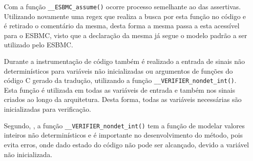 \par
Com a função \texttt{\_\_ESBMC\_assume()} ocorre processo semelhante ao das assertivas. Utilizando novamente uma regex que realiza a busca por esta função no código e é retirado o comentário da mesma, desta forma a mesma passa a esta acessível para o ESBMC, visto que a declaração da mesma já segue o modelo padrão a ser utilizado pelo ESBMC.

\par
Durante a instrumentação de código também é realizado a entrada de sinais não determinísticos para variáveis não inicializadas ou argumentos de funções do código C gerado da tradução, utilizando a função \texttt{\_\_VERIFIER\_nondet\_int()}. Esta função é utilizada em todas as variáveis de entrada e também nos sinais criados ao longo da arquitetura. Desta forma, todas as variáveis necessárias são inicializadas para verificação.

\par
Segundo, , a função \texttt{\_\_VERIFIER\_nondet\_int()} tem a função de modelar valores inteiros não determinísticos e é importante no desenvolvimento do método, pois evita erros, onde dado estado do código não pode ser alcançado, devido a variável não inicializada.

